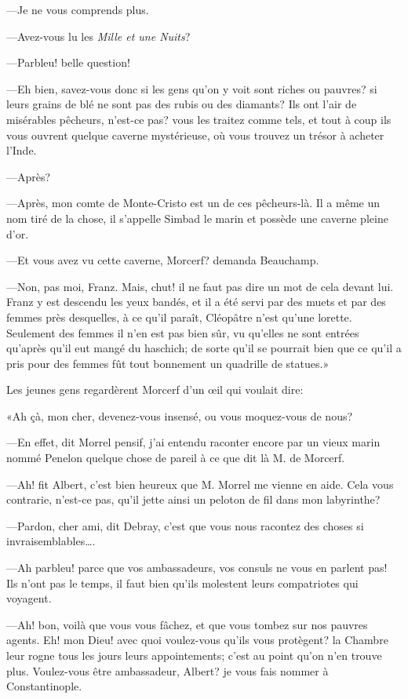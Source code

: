 —Je ne vous comprends plus. 

—Avez-vous lu les \textit{Mille et une Nuits}? 

—Parbleu! belle question! 

—Eh bien, savez-vous donc si les gens qu'on y voit sont riches ou pauvres? si leurs grains de blé ne sont pas des rubis ou des diamants? Ils ont l'air de misérables pêcheurs, n'est-ce pas? vous les traitez comme tels, et tout à coup ils vous ouvrent quelque caverne mystérieuse, où vous trouvez un trésor à acheter l'Inde. 

—Après? 

—Après, mon comte de Monte-Cristo est un de ces pêcheurs-là. Il a même un nom tiré de la chose, il s'appelle Simbad le marin et possède une caverne pleine d'or. 

—Et vous avez vu cette caverne, Morcerf? demanda Beauchamp. 

—Non, pas moi, Franz. Mais, chut! il ne faut pas dire un mot de cela devant lui. Franz y est descendu les yeux bandés, et il a été servi par des muets et par des femmes près desquelles, à ce qu'il paraît, Cléopâtre n'est qu'une lorette. Seulement des femmes il n'en est pas bien sûr, vu qu'elles ne sont entrées qu'après qu'il eut mangé du haschich; de sorte qu'il se pourrait bien que ce qu'il a pris pour des femmes fût tout bonnement un quadrille de statues.» 

Les jeunes gens regardèrent Morcerf d'un œil qui voulait dire: 

«Ah çà, mon cher, devenez-vous insensé, ou vous moquez-vous de nous? 

—En effet, dit Morrel pensif, j'ai entendu raconter encore par un vieux marin nommé Penelon quelque chose de pareil à ce que dit là M. de Morcerf. 

—Ah! fit Albert, c'est bien heureux que M. Morrel me vienne en aide. Cela vous contrarie, n'est-ce pas, qu'il jette ainsi un peloton de fil dans mon labyrinthe?  

—Pardon, cher ami, dit Debray, c'est que vous nous racontez des choses si invraisemblables\dots. 

—Ah parbleu! parce que vos ambassadeurs, vos consuls ne vous en parlent pas! Ils n'ont pas le temps, il faut bien qu'ils molestent leurs compatriotes qui voyagent. 

—Ah! bon, voilà que vous vous fâchez, et que vous tombez sur nos pauvres agents. Eh! mon Dieu! avec quoi voulez-vous qu'ils vous protègent? la Chambre leur rogne tous les jours leurs appointements; c'est au point qu'on n'en trouve plus. Voulez-vous être ambassadeur, Albert? je vous fais nommer à Constantinople. 

